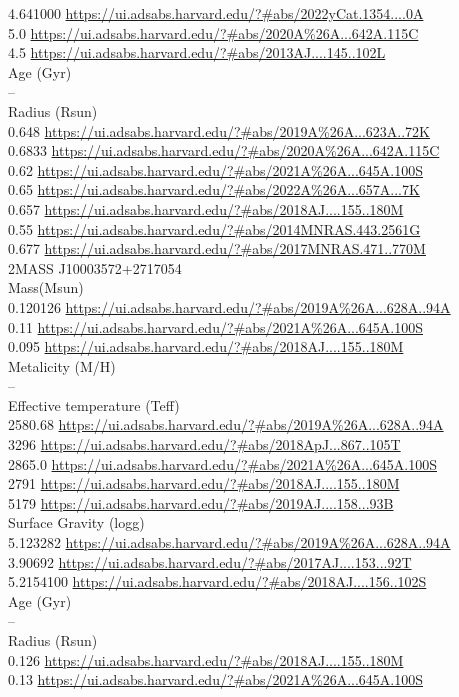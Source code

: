 4.641000 \url{https://ui.adsabs.harvard.edu/?#abs/2022yCat.1354....0A}\\
5.0 \url{https://ui.adsabs.harvard.edu/?#abs/2020A%26A...642A.115C}\\
4.5 \url{https://ui.adsabs.harvard.edu/?#abs/2013AJ....145..102L}\\
Age (Gyr)\\
--\\
Radius (Rsun)\\
0.648 \url{https://ui.adsabs.harvard.edu/?#abs/2019A%26A...623A..72K}\\
0.6833 \url{https://ui.adsabs.harvard.edu/?#abs/2020A%26A...642A.115C}\\
0.62 \url{https://ui.adsabs.harvard.edu/?#abs/2021A%26A...645A.100S}\\
0.65 \url{https://ui.adsabs.harvard.edu/?#abs/2022A%26A...657A...7K}\\
0.657 \url{https://ui.adsabs.harvard.edu/?#abs/2018AJ....155..180M}\\
0.55 \url{https://ui.adsabs.harvard.edu/?#abs/2014MNRAS.443.2561G}\\
0.677 \url{https://ui.adsabs.harvard.edu/?#abs/2017MNRAS.471..770M}\\
2MASS J10003572+2717054\\
Mass(Msun)\\
0.120126 \url{https://ui.adsabs.harvard.edu/?#abs/2019A%26A...628A..94A}\\
0.11 \url{https://ui.adsabs.harvard.edu/?#abs/2021A%26A...645A.100S}\\
0.095 \url{https://ui.adsabs.harvard.edu/?#abs/2018AJ....155..180M}\\
Metalicity (M/H)\\
--\\
Effective temperature (Teff) \\
2580.68 \url{https://ui.adsabs.harvard.edu/?#abs/2019A%26A...628A..94A}\\
3296 \url{https://ui.adsabs.harvard.edu/?#abs/2018ApJ...867..105T}\\
2865.0 \url{https://ui.adsabs.harvard.edu/?#abs/2021A%26A...645A.100S}\\
2791 \url{https://ui.adsabs.harvard.edu/?#abs/2018AJ....155..180M}\\
5179 \url{https://ui.adsabs.harvard.edu/?#abs/2019AJ....158...93B}\\
Surface Gravity (logg) \\
5.123282 \url{https://ui.adsabs.harvard.edu/?#abs/2019A%26A...628A..94A}\\
3.90692 \url{https://ui.adsabs.harvard.edu/?#abs/2017AJ....153...92T}\\
5.2154100 \url{https://ui.adsabs.harvard.edu/?#abs/2018AJ....156..102S}\\
Age (Gyr)\\
--\\
Radius (Rsun)\\
0.126 \url{https://ui.adsabs.harvard.edu/?#abs/2018AJ....155..180M}\\
0.13 \url{https://ui.adsabs.harvard.edu/?#abs/2021A%26A...645A.100S}\\
